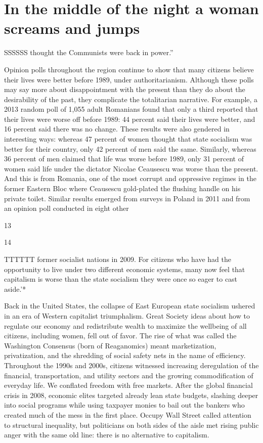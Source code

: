\section{In the middle of the night a woman screams and jumps}
 \par 
SSSSSS thought the Communists were back in power.”
 \par 
Opinion polls throughout the region continue to show that many citizens believe their lives were better before 1989, under authoritarianism. Although these polls may say more about disappointment with the present than they do about the desirability of the past, they complicate the totalitarian narrative. For example, a 2013 random poll of 1,055 adult Romanians found that only a third reported that their lives were worse off before 1989: {\color{blue}44} percent said their lives were better, and {\color{blue}16} percent said there was no change. These results were also gendered in interesting ways: whereas {\color{blue}47} percent of women thought that state socialism was better for their country, only {\color{blue}42} percent of men said the same. Similarly, whereas {\color{blue}36} percent of men claimed that life was worse before 1989, only {\color{blue}31} percent of women said life under the dictator Nicolae Ceausescu was worse than the present. And this is from Romania, one of the most corrupt and oppressive regimes in the former Eastern Bloc where Ceausescu gold-plated the flushing handle on his private toilet. Similar results emerged from surveys in Poland in 2011 and from an opinion poll conducted in eight other
 \par 
13
 \par 
14
 \par 
TTTTTT former socialist nations in 2009. For citizens who have had the opportunity to live under two different economic systems, many now feel that capitalism is worse than the state socialism they were once so eager to cast aside.’*
 \par 
Back in the United States, the collapse of East European state socialism ushered in an era of Western capitalist triumphalism. Great Society ideas about how to regulate our economy and redistribute wealth to maximize the wellbeing of all citizens, including women, fell out of favor. The rise of what was called the Washington Consensus (born of Reaganomics) meant marketization, privatization, and the shredding of social safety nets in the name of efficiency. Throughout the 1990s and 2000s, citizens witnessed increasing deregulation of the financial, transportation, and utility sectors and the growing commodification of everyday life. We conflated freedom with free markets. After the global financial crisis in 2008, economic elites targeted already lean state budgets, slashing deeper into social programs while using taxpayer monies to bail out the bankers who created much of the mess in the first place. Occupy Wall Street called attention to structural inequality, but politicians on both sides of the aisle met rising public anger with the same old line: there is no alternative to capitalism.

